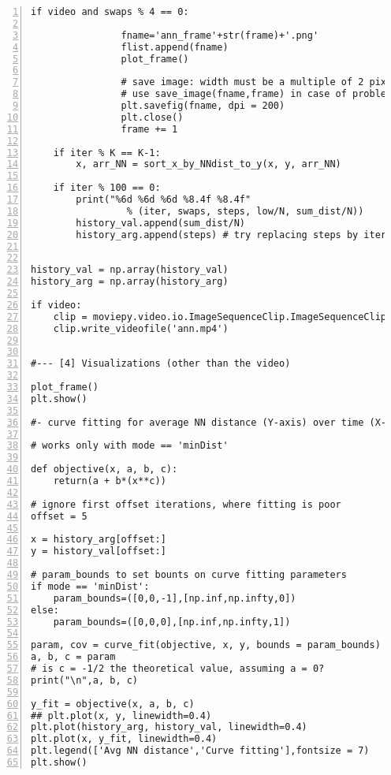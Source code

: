 \documentclass[oneside,10pt]{book}
\begin{document}
\begin{lstlisting}[numbers=left]
            if video and swaps % 4 == 0:

                fname='ann_frame'+str(frame)+'.png'
                flist.append(fname)
                plot_frame() 

                # save image: width must be a multiple of 2 pixels, all with same size
                # use save_image(fname,frame) in case of problems with plt.savefig
                plt.savefig(fname, dpi = 200)
                plt.close() 
                frame += 1

    if iter % K == K-1:
        x, arr_NN = sort_x_by_NNdist_to_y(x, y, arr_NN)

    if iter % 100 == 0:
        print("%6d %6d %6d %8.4f %8.4f" 
                 % (iter, swaps, steps, low/N, sum_dist/N))
        history_val.append(sum_dist/N)
        history_arg.append(steps) # try replacing steps by iter 


history_val = np.array(history_val)
history_arg = np.array(history_arg)

if video:
    clip = moviepy.video.io.ImageSequenceClip.ImageSequenceClip(flist, fps=6)
    clip.write_videofile('ann.mp4')


#--- [4] Visualizations (other than the video)

plot_frame()
plt.show()

#- curve fitting for average NN distance (Y-axis) over time (X-axis)

# works only with mode == 'minDist'

def objective(x, a, b, c):
    return(a + b*(x**c)) 

# ignore first offset iterations, where fitting is poor
offset = 5

x = history_arg[offset:]
y = history_val[offset:]

# param_bounds to set bounts on curve fitting parameters
if mode == 'minDist':
    param_bounds=([0,0,-1],[np.inf,np.infty,0])  
else: 
    param_bounds=([0,0,0],[np.inf,np.infty,1])  

param, cov = curve_fit(objective, x, y, bounds = param_bounds)   
a, b, c = param
# is c = -1/2 the theoretical value, assuming a = 0?
print("\n",a, b, c)  

y_fit = objective(x, a, b, c)
## plt.plot(x, y, linewidth=0.4)
plt.plot(history_arg, history_val, linewidth=0.4)
plt.plot(x, y_fit, linewidth=0.4)
plt.legend(['Avg NN distance','Curve fitting'],fontsize = 7)
plt.show()
\end{lstlisting}
\end{document}
